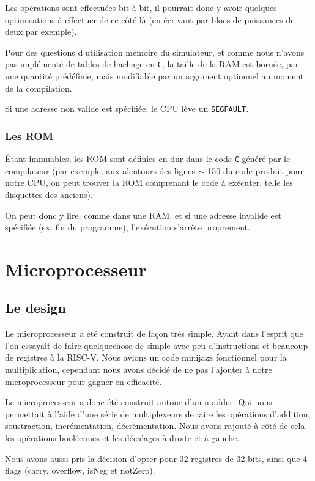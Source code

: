 \documentclass[10pt,a4paper,notitlepage ]{article}
\begin{document}
	Les opérations sont effectuées bit à bit, il pourrait donc y avoir quelques optimisations à effectuer de ce côté là (en écrivant par blocs de puissances de deux par exemple).
	
	Pour des questions d'utilisation mémoire du simulateur, et comme nous n'avons pas implémenté de tables de hachage en \texttt{C}, la taille de la RAM est bornée, par une quantité prédéfinie, mais modifiable par un argument optionnel au moment de la compilation.
	
	Si une adresse non valide est spécifiée, le CPU lève un \texttt{SEGFAULT}.
	
	\subsubsection{Les ROM}
	
	Étant immuables, les ROM sont définies en dur dans le code \texttt{C} généré par le compilateur (par exemple, aux alentours des lignes  $\sim$ 150 du code produit pour notre CPU, on peut trouver la ROM comprenant le code à exécuter, telle les disquettes des anciens).
	
	On peut donc y lire, comme dans une RAM, et si une adresse invalide est spécifiée (ex: fin du programme), l'exécution s'arrête proprement.
	
	
	\section{Microprocesseur}

		\subsection{Le design}

		Le microprocesseur a été construit de façon très simple. Ayant dans l'esprit que l'on essayait de faire quelquechose de simple avec peu d'instructions et beaucoup de registres à la RISC-V. Nous avions un code minijazz fonctionnel pour la multiplication, cependant nous avons décidé de ne pas l'ajouter à notre microprocesseur pour gagner en efficacité.

		Le microprocesseur a donc été construit autour d'un n-adder. Qui nous permettait à l'aide d'une série de multiplexeurs de faire les opérations d'addition, soustraction, incrémentation, décrémentation. Nous avons rajouté à côté de cela les opérations booléennes et les décalages à droite et à gauche.

		Nous avons aussi pris la décision d'opter pour 32 registres de 32 bits, ainsi que 4 flags (carry, overflow, isNeg et notZero).
\end{document}

